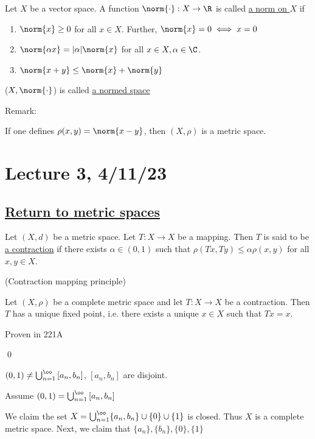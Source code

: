 \documentclass[x11names,reqno,14pt]{extarticle}
\newcommand{\seq}[2][\oo]{_{#2 = 1}^#1}
\newcommand{\bigcupn}[1][\oo]{\bigcup\seq[#1]{n}}
\begin{document}

Let $X$ be a vector space. A function $\norm{\cdot}:X\to\R$ is called \underline{a norm on $X$} if
\begin{enumerate}[label=(\roman*)]

\item $\norm{x}\geq0$ for all $x \in X$.  Further, $\norm{x} = 0 \iff x = 0$
\item $\norm{\alpha x} = |\alpha|\norm{x}$ for all $x \in X, \alpha \in \C$.
\item $\norm{x + y} \leq \norm{x} + \norm{y}$

\end{enumerate}

($X, \norm{\cdot}$) is called \underline{a normed space}

Remark:

If one defines $\rho(x, y) = \norm{x - y}$, then $(X, \rho)$ is a metric space.

\section*{Lecture 3, 4/11/23}

\subsection*{\underline{Return to metric spaces}}

 Let $(X, d)$ be a metric space. Let $T:X\to X$ be a mapping. Then $T$ is said to be \underline{a contraction} if there exists $\alpha\in(0,1)$ such that $\rho(Tx,Ty) \leq \alpha\rho(x, y)$ for all $x, y \in X$. 

\thm (Contraction mapping principle)

Let $(X, \rho)$ be a complete metric space and let $T:X\to X$ be a contraction. Then $T$ has a unique fixed point, i.e. there exists a unique $x \in X$ such that $Tx = x$. 

\proof

Proven in 221A

\qed

\claim

$(0, 1) \neq \bigcupn\,[a_n, b_n]$, $[a_n, b_n]$ are disjoint. 

\proof 

Assume $(0, 1) = \bigcupn\, [a_n,b_n]$

We claim the set $X = \bigcupn \{a_n, b_n \} \cup \{0\} \cup \{1\}$ is closed. Thus $X$ is a complete metric space. Next, we claim that $\{a_n\},\{b_n\},\{0\},\{1\}$
\end{document}
